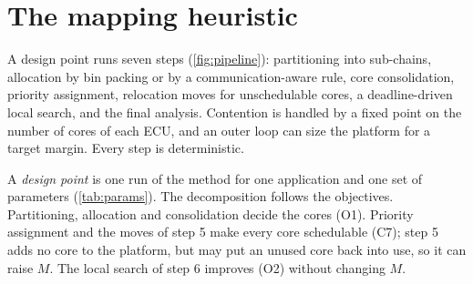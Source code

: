 \section{The mapping heuristic}
\label{sec:method}

\begin{inbrief}
A design point runs seven steps (\cref{fig:pipeline}): partitioning into
sub-chains, allocation by bin packing or by a communication-aware rule,
core consolidation, priority assignment, relocation moves for
unschedulable cores, a deadline-driven local search, and the final
analysis. Contention is handled by a fixed point on the number of cores
of each ECU, and an outer loop can size the platform for a target
margin. Every step is deterministic.
\end{inbrief}

A \emph{design point} is one run of the method for one application and
one set of parameters (\cref{tab:params}). The decomposition follows the
objectives. Partitioning, allocation and consolidation decide the cores
(O1). Priority assignment and the moves of step 5 make every core
schedulable (C7); step 5 adds no core to the platform, but may put an
unused core back into use, so it can raise $M$. The local search of step 6
improves (O2) without changing $M$.

